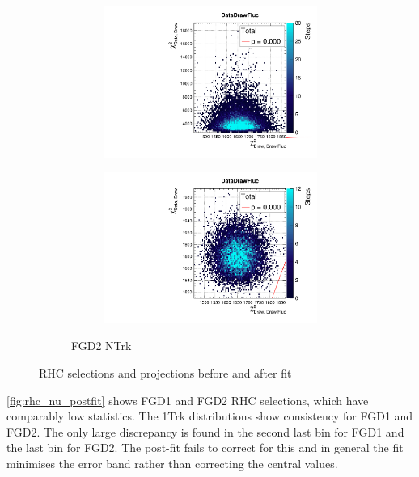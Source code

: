 \begin{figure}[h]
\begin{subfigure}[t]{\textwidth}
\begin{subfigure}[t]{0.24\textwidth}
\includegraphics[width=\textwidth, trim={0mm 0mm 0mm 8mm}, clip,page=92]{figures/mach3/data/priorpred/2017b_NewDet_3Xsec_4Det_5Flux_NewXSecTune_Data_merge_PriorPred_procs}
\end{subfigure}
\begin{subfigure}[t]{0.24\textwidth}
\includegraphics[width=\textwidth, trim={0mm 0mm 0mm 8mm}, clip,page=92]{figures/mach3/data/postpred/2017b_NewData_NewDet_UpdXsecStep_2Xsec_4Det_5Flux_0_PostPred_procs}
\end{subfigure}
\caption{FGD2 NTrk}
\end{subfigure}
\caption{RHC \numubar selections \pmu and \cosmu projections before and after fit}
\label{fig:rhc_postfit}
\end{figure}

\autoref{fig:rhc_nu_postfit} shows FGD1 and FGD2 RHC \numu selections, which have comparably low statistics. The 1Trk distributions show consistency for FGD1 and FGD2. The only large discrepancy is found in the second last \cosmu bin for FGD1 and the last \cosmu bin for FGD2. The post-fit fails to correct for this and in general the fit minimises the error band rather than correcting the central values.

